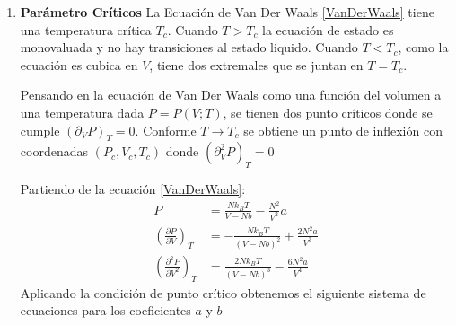 \documentclass[12pt,letterpaper]{article}
\newcommand{\pd}[3] {\left(\frac{\partial #1}{\partial #2}\right)_{#3}}
\newcommand{\pdd}[3] {\left(\frac{\partial^2 #1}{\partial {#2}^2}\right)_{#3}}
\begin{document}
\begin{enumerate}
Utilizando \eqref{rRed}-\eqref{ConsRed} en \eqref{PressHS} obtenemos:
\begin{align}
\frac{p^*_{hs}}{\beta\sigma^3} &= \frac{n^*}{\beta\sigma^3}\left[ 1 +\frac{2}{3}\pi\sigma^3\frac{n^*}{\sigma^3} g_{hs}(1^+) \right] \nonumber \\
p^*_{hs} &= n^* \left[ 1 +\frac{2}{3}\pi n^* g_{hs}(1^+) \right] \nonumber \\
p^*_{hs} &= n^* \left[ 1 + n^*b^*\right] \label{PressHS_Red}
\intertext{Donde:}
b^* &= \frac{2}{3}\pi g_{hs}(1^+) \label{bstar}
\end{align}
Ahora en \eqref{Press} obtenemos:

\begin{align}
\frac{p^*}{\beta\sigma^3} &= \frac{p^*_{hs}}{\beta\sigma^3} - \left(\frac{n^*}{\sigma^3}\right)^2 \left[ a(n^*) + \frac{n^*}{\sigma^3} \left( \frac{\partial a(n^*)}{\partial\frac{n^*}{\sigma^3}} \right)_{T^*} \right] \nonumber \\
p^* &= p^*_{hs}  - \frac{\beta {n^*}^2}{\sigma^3}\left[ a(n^*) + n^* \left( \frac{\partial a(n^*)}{\partial n^*} \right)_{T^*} \right] \nonumber \\
p^* &= p^*_{hs} - {n^*}^2\left[ \frac{\beta}{\sigma^3}a(n^*) + n^* \left(\frac{\partial\frac{\beta}{\sigma^3}a(n^*)}{\partial n^*}\right)_{T^*}\right] \nonumber \\
p^* &= p^*_{hs} - \left[ a^* + n^* \left(\frac{\partial a^*}{\partial n^*}\right)_{T^*} \right] {n^*}^2 \label{Press_Red}
\intertext{Donde:}
a^* &= \frac{\beta}{\sigma^3}a(n^*) \label{a_star}
\end{align}

\item[III.] \textbf{Parámetro Críticos} 
La Ecuación de Van Der Waals \eqref{VanDerWaals} tiene una temperatura crítica $T_c$.
Cuando $T>T_c$ la ecuación de estado es monovaluada y no hay transiciones al estado liquido. Cuando $T<T_c$, como la ecuación es cubica en $V$, tiene dos extremales que se juntan en $T=T_c$.

Pensando en la ecuación de Van Der Waals como una función del volumen a una temperatura dada $P = P(V;T)$, se tienen dos punto críticos donde se cumple   $\left( \partial_V P \right)_T = 0 $. Conforme $T\rightarrow T_c$ se obtiene un punto de inflexión con coordenadas $(P_c, V_c, T_c)$ donde $\left( \partial^2_V P \right)_T=0$

Partiendo de la ecuación \eqref{VanDerWaals}:
\begin{align}
	P &= \frac{Nk_B T}{V-Nb} - \frac{N^2}{V^2}a	\label{PresVanDerWaals} \\
	\pd{P}{V}{T} &= -\frac{Nk_BT}{(V-Nb)^2} + \frac{2N^2a}{V^3} \label{P_Vdw_Dif} \\
	\pdd{P}{V}{T} &= \frac{2Nk_BT}{(V-Nb)^3} - \frac{6N^2a}{V^4} \label{P_Vdw_Dif2}
\end{align}
Aplicando la condición de punto crítico obtenemos el siguiente sistema de ecuaciones para los coeficientes $a$ y $b$


\end{enumerate}
\end{document}
